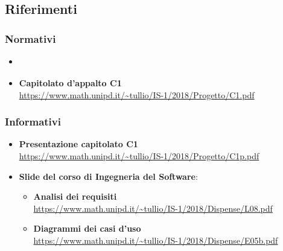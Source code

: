 	\subsection{Riferimenti}

	\subsubsection{Normativi}
	\begin{itemize}
		\item \textbf{\Doc{\NdPv}}
		\item \textbf{Capitolato d'appalto C1}\\
		\url{https://www.math.unipd.it/~tullio/IS-1/2018/Progetto/C1.pdf}
	\end{itemize}

	\subsubsection{Informativi}
	\begin{itemize}
		\item \textbf{Presentazione capitolato C1}\\
		\url{https://www.math.unipd.it/~tullio/IS-1/2018/Progetto/C1p.pdf}
		\item \textbf{Slide del corso di Ingegneria del Software}:
		\begin{itemize}
			\item \textbf{Analisi dei requisiti}\\
			\url{https://www.math.unipd.it/~tullio/IS-1/2018/Dispense/L08.pdf}
			\item \textbf{Diagrammi dei casi d'uso}\\
			\url{https://www.math.unipd.it/~tullio/IS-1/2018/Dispense/E05b.pdf}
		\end{itemize}
	\end{itemize}